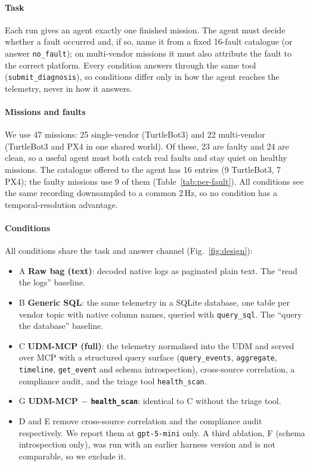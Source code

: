 \documentclass[conference]{IEEEtran}
\newcommand{\condA}{A}
\newcommand{\condB}{B}
\newcommand{\condC}{C}
\newcommand{\condG}{G}
\newcommand{\hs}{\texttt{health\_scan}}
\begin{document}
\paragraph{Task} Each run gives an agent exactly one finished mission. The agent
must decide whether a fault occurred and, if so, name it from a fixed 16-fault
catalogue (or answer \texttt{no\_fault}); on multi-vendor missions it must also
attribute the fault to the correct platform. Every condition answers through the
same tool (\texttt{submit\_diagnosis}), so conditions differ only in how the agent
reaches the telemetry, never in how it answers.

\paragraph{Missions and faults} We use 47 missions: 25 single-vendor (TurtleBot3)
and 22 multi-vendor (TurtleBot3 and PX4 in one shared world). Of these, 23 are
faulty and 24 are clean, so a useful agent must both catch real faults and stay
quiet on healthy missions. The catalogue offered to the agent has 16 entries
(9 TurtleBot3, 7 PX4); the faulty missions use 9 of them
(Table~\ref{tab:per-fault}). All conditions see the same recording downsampled to a
common 2\,Hz, so no condition has a temporal-resolution advantage.

\paragraph{Conditions} All conditions share the task and answer channel
(Fig.~\ref{fig:design}):
\begin{itemize}
  \item \condA{} \textbf{Raw bag (text)}: decoded native logs as paginated plain
  text. The ``read the logs'' baseline.
  \item \condB{} \textbf{Generic SQL}: the same telemetry in a SQLite database, one
  table per vendor topic with native column names, queried with \texttt{query\_sql}.
  The ``query the database'' baseline.
  \item \condC{} \textbf{UDM-MCP (full)}: the telemetry normalised into the UDM and
  served over MCP with a structured query surface (\texttt{query\_events},
  \texttt{aggregate}, \texttt{timeline}, \texttt{get\_event} and schema
  introspection), cross-source correlation, a compliance audit, and the triage
  tool \hs{}.
  \item \condG{} \textbf{UDM-MCP $-$ \hs{}}: identical to \condC{} without the
  triage tool.
  \item D and E remove cross-source correlation and the compliance audit
  respectively. We report them at \texttt{gpt-5-mini} only. A third ablation, F
  (schema introspection only), was run with an earlier harness version and is not
  comparable, so we exclude it.
\end{itemize}
\end{document}
